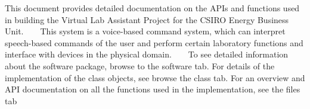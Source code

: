 This document provides detailed documentation on the A\+PI\textquotesingle{}s and functions used in building the Virtual Lab Assistant Project for the C\+S\+I\+RO Energy Business Unit. ~\newline
~\newline
 This system is a voice-\/based command system, which can interpret speech-\/based commands of the user and perform certain laboratory functions and interface with devices in the physical domain. ~\newline
~\newline
 To see detailed information about the software package, browse to the \textquotesingle{}software\textquotesingle{} tab. For details of the implementation of the class objects, see browse the \textquotesingle{}class\textquotesingle{} tab. For an overview and A\+PI documentation on all the functions used in the implementation, see the \textquotesingle{}files\textquotesingle{} tab 